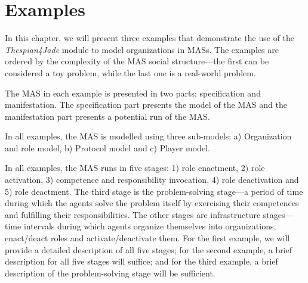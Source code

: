 
\chapter{Examples}

In this chapter, we will present three examples that demonstrate the use of the \textit{Thespian4Jade} module to model organizations in MASs.
The examples are ordered by the complexity of the MAS social structure---the first can be considered a toy problem, while the last one is a real-world problem.

The MAS in each example is presented in two parts: specification and manifestation.
The specification part presents the model of the MAS and the manifestation part presents a potential run of the MAS.

In all examples, the MAS is modelled using three sub-models: a) Organization and role model, b) Protocol model and c) Player model.

In all examples, the MAS runs in five stages: 1) role enactment, 2) role activation, 3) competence and responsibility invocation, 4) role deactivation and 5) role deactment.
The third stage is the problem-solving stage---a period of time during which the agents solve the problem itself by exercising their competences and fulfilling their responsibilities.
The other stages are infrastructure stages---time intervals during which agents organize themselves into organizations, enact/deact roles and activate/deactivate them.
For the first example, we will provide a detailed description of all five stages; for the second example, a brief description for all five stages will suffice; and for the third example, a brief description of the problem-solving stage will be sufficient.

